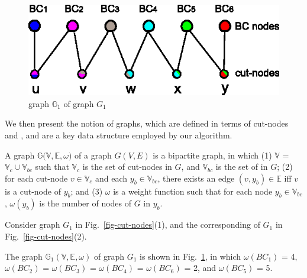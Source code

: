 \begin{figure}[tb!]
\begin{center}
\includegraphics[scale=0.9]{./sketch-graphs.eps}
\end{center}
\vspace{-2ex}
\caption{\bcsketch graph $\mathbb{G}_1$ of graph $G_1$}
\label{fig-sketch-graph}\vspace{-3ex}
\end{figure}

We then present the notion of \bcsketch graphs, which are defined in terms of cut-nodes and \bccs, and are a key data structure employed by our algorithm.

A \bcsketch graph $\mathbb{G(V, E}, \omega)$ of a graph $G(V, E)$ is a bipartite graph, in which (1) $\mathbb{V}$ = $\mathbb{V}_{c}\cup \mathbb{V}_{bc}$
such that $\mathbb{V}_{c}$ is the set of cut-nodes in $G$, and $\mathbb{V}_{bc}$ is the set of \bccs in $G$;
(2) for each cut-node $v\in \mathbb{V}_{c}$ and each \bc $y_{b}\in \mathbb{V}_{bc}$, there exists an edge $(v, y_b)\in \mathbb{E}$ iff $v$ is a cut-node of \bc $y_b$;
and (3) $\omega$ is a weight function such that for each node $y_b\in \mathbb{V}_{bc}$, $\omega(y_b)$ is the number of nodes of $G$ in \bc $y_b$.




\vspace{-0.5ex}
\begin{example}
\label{exm-sketch-graph} Consider graph $G_1$ in Fig.~\ref{fig-cut-nodes}(1), and the corresponding \bccs of $G_1$ in Fig.~\ref{fig-cut-nodes}(2).



The \bcsketch graph $\mathbb{G}_1(\mathbb{V, E}, \omega)$ of graph $G_1$ is shown in Fig.~\ref{fig-sketch-graph},
in which $\omega(BC_1)$ = 4, $\omega(BC_2)$ = $\omega(BC_3)$ = $\omega(BC_4)$ = $\omega(BC_6)$ = 2, and $\omega(BC_5)$ = 5.
\end{example}

